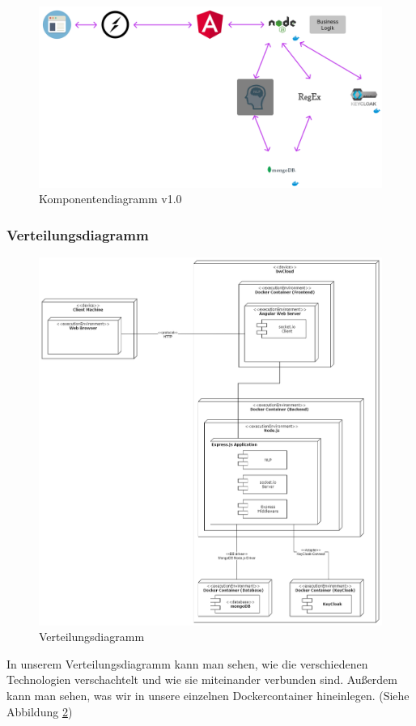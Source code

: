 \begin{figure}[!hbt]
\centering
\includegraphics[width=1.0\textwidth]{bilder/technologien/Komponenten-Diagram-v1.png}
\caption{Komponentendiagramm v1.0}
\label{fig:Komponentendiagramm_v1.0}
\end{figure}
\FloatBarrier %

\subsubsection{Verteilungsdiagramm}

\begin{figure}[H]
\centering
\includegraphics[width=1.0\textwidth]{bilder/technologien/Verteilunsgdiagramm.png}
\caption{Verteilungsdiagramm}
\label{fig:Verteilungsdiagramm}
\end{figure}
In unserem Verteilungsdiagramm kann man sehen, 
wie die verschiedenen Technologien verschachtelt und wie sie miteinander verbunden sind.
Außerdem kann man sehen, was wir in unsere einzelnen Dockercontainer hineinlegen.
\newline
(Siehe Abbildung \ref{fig:Verteilungsdiagramm})
